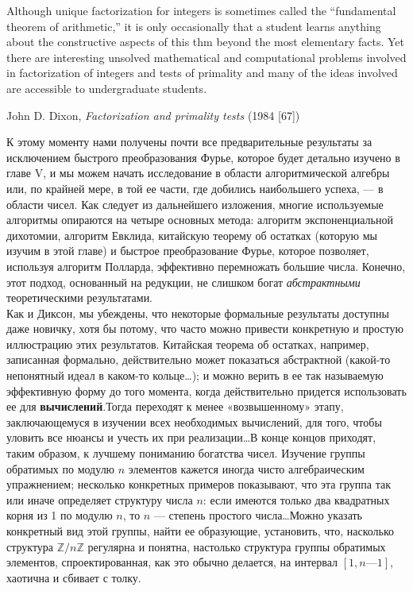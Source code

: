     \epigraph {Although unique factorization for integers is sometimes called the
    “fundamental theorem of arithmetic,” it is only occasionally that a
    student learns anything about the constructive aspects of this
    thm beyond the most elementary facts. Yet there are interesting
    unsolved mathematical and computational problems involved in
    factorization of integers and tests of primality and many of the ideas
    involved are accessible to undergraduate students\footnotemark[1].}{John D. Dixon, \emph{ Factorization and primality tests} (1984 [67])}
    К этому моменту нами получены почти все предварительные результаты за исключением быстрого преобразования Фурье, которое будет детально изучено в главе V, и мы можем начать исследование в области алгоритмической алгебры или, по крайней мере, в той ее
    части, где добились наибольшего успеха, — в области чисел. Как следует из дальнейшего изложения, многие используемые алгоритмы
    опираются на четыре основных метода: алгоритм экспоненциальной дихотомии, алгоритм Евклида, китайскую теорему об остатках (которую мы
    изучим в этой главе) и быстрое преобразование Фурье, которое позволяет, используя алгоритм Полларда, эффективно перемножать большие числа. Конечно,
    этот подход, основанный на редукции, не слишком богат \textit{абстрактными} теоретическими результатами.\\
    \indent Как и Диксон, мы убеждены, что некоторые формальные результаты доступны даже новичку, хотя бы потому, что часто можно привести конкретную и простую иллюстрацию этих результатов. Китайская теорема об остатках, например, записанная формально, действительно может показаться абстрактной (какой-то непонятный идеал в каком-то кольце\ldots); и можно верить в ее так называемую эффективную форму до того момента, когда действительно придется использовать ее для {\textbf{вычислений}}.\linebreak Тогда переходят к менее «возвышенному» этапу, заключающемуся в изучении всех необходимых вычислений, для того, чтобы уловить все нюансы и учесть их при реализации\ldots\;В конце концов приходят, таким образом, к лучшему пониманию богатства чисел. Изучение группы обратимых по модулю $n$ элементов кажется иногда чисто алгебраическим упражнением; несколько конкретных примеров показывают, что эта группа так или иначе определяет структуру числа $n$: если имеются только два квадратных корня из 1 по модулю $n$, то $n$ — степень простого числа\ldots\;Можно указать конкретный вид этой группы, найти ее образующие, установить, что, насколько структура $\mathbb{Z}/n\mathbb{Z}$ регулярна и понятна, настолько структура группы обратимых элементов, спроектированная, как это обычно делается, на интервал $[1, n — 1]$, хаотична и сбивает с толку.\\
